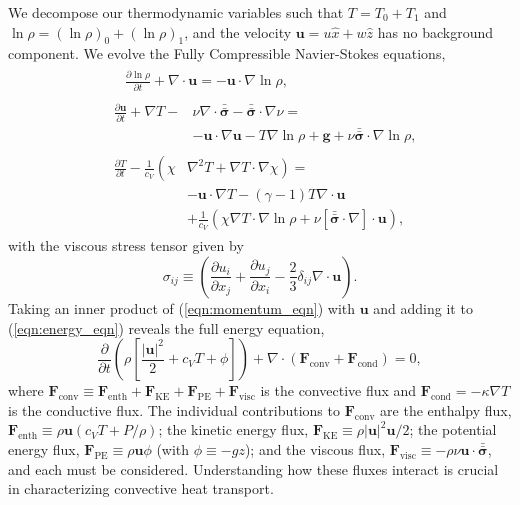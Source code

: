 \documentclass[aps, prl, twocolumn, nofootinbib, groupedaddress, amsfonts, amssymb, amsmath]{revtex4-1}
\newcommand{\Div}[1]{\ensuremath{\nabla\cdot\left( #1\right)}}
\newcommand{\grad}{\ensuremath{\nabla}}
\newcommand{\lilstressT}{\ensuremath{\bm{\bar{\bar{\sigma}}}}}
\begin{document}
We decompose our thermodynamic variables such that $T = T_0 + T_1$ and
$\ln\rho = (\ln\rho)_0 + (\ln\rho)_1$, 
and the velocity $\bm{u} = u\hat{x} + w\hat{z}$ 
has no background component.    
We evolve the Fully Compressible Navier-Stokes equations,
\begin{align}
&\begin{aligned}
&\frac{\partial \ln\rho}{\partial t} + \grad\cdot\bm{u} 
    = -\bm{u}\cdot\grad\ln\rho,
	\label{eqn:continuity_eqn}
\end{aligned}\\
&\begin{aligned}
\frac{\partial\bm{u}}{\partial t} + \grad T - 
&\nu\grad\cdot\lilstressT - \lilstressT\cdot\grad\nu = \\
&-\bm{u}\cdot\grad\bm{u} - T\grad\ln\rho + \bm{g} + 
\nu\lilstressT\cdot\grad\ln\rho,
\label{eqn:momentum_eqn}
\end{aligned}\\
&\begin{aligned}
\frac{\partial T}{\partial t} -\frac{1}{c_V}\left(\right.\chi&\left.
    \grad^2 T + \grad T\cdot\grad\chi\right) = \\
	&-\bm{u}\cdot\grad T - (\gamma-1)T\grad\cdot{\bm{u}} \\
	&+ \frac{1}{c_V}\left(\chi\grad T \cdot\grad\ln\rho +
	\nu\left[\lilstressT\cdot\nabla\right]\cdot\bm{u}\right), 
	\label{eqn:energy_eqn}
\end{aligned}
\end{align}
with the viscous stress tensor given by
\begin{equation}
\sigma_{ij} \equiv \left(\frac{\partial u_i}{\partial x_j} + 
\frac{\partial u_j}{\partial x_i} - \frac{2}{3}\delta_{ij}\grad\cdot\bm{u}\right).
	\label{eqn:stress_tensor}
\end{equation}
Taking an inner product of
(\ref{eqn:momentum_eqn}) with $\bm{u}$ and adding it to 
(\ref{eqn:energy_eqn}) reveals the full energy equation,
\begin{equation}
\frac{\partial}{\partial t}\left(\rho\left[\frac{|\bm{u}|^2}{2} + c_V T + \phi\right]\right) +
\Div{\bm{F}_{\text{conv}} + \bm{F}_{\text{cond}}} = 0,
	\label{eqn:energy_eqn_full}
\end{equation}
where
$
\bm{F}_{\text{conv}} \equiv \bm{F}_{\text{enth}} + \bm{F}_{\text{KE}} + \bm{F}_{\text{PE}} + \bm{F}_{\text{visc}}
$
is the convective flux and $\bm{F}_{\text{cond}} = -\kappa \grad T$
is the conductive flux.
The individual contributions to $\bm{F}_{\text{conv}}$ are the enthalpy flux, 
$\bm{F}_{\text{enth}} \equiv \rho\bm{u}(c_V T + P/\rho)$;
the kinetic energy flux, 
$\bm{F}_{\text{KE}} \equiv \rho|\bm{u}|^2\bm{u}/2$;
the potential energy flux,
$\bm{F}_{\text{PE}} \equiv \rho\bm{u}\phi$ (with $\phi \equiv -gz$);
and the viscous flux, 
$\bm{F}_{\text{visc}} \equiv -\rho\nu\bm{u}\cdot\lilstressT$, and each 
must be considered. 
Understanding how these fluxes interact  
is crucial in characterizing convective heat transport.
\end{document}
